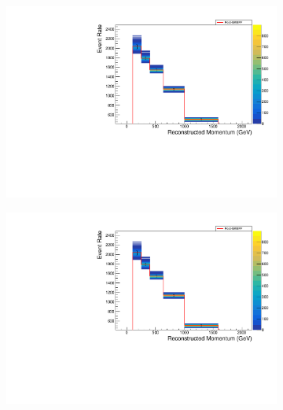 \begin{figure}[h]
  \begin{subfigure}[t]{0.49\textwidth}
    \includegraphics[width=\textwidth, trim={0mm 0mm 0mm 0mm}, clip,page=3]{Figures/OA/Overlay_ShiftSmear.pdf}
  \end{subfigure}%
  \begin{subfigure}[t]{0.49\textwidth}
    \includegraphics[width=\textwidth, trim={0mm 0mm 0mm 0mm}, clip,page=6]{Figures/OA/Overlay_ShiftSmear.pdf}
  \end{subfigure}
  \begin{subfigure}[t]{0.49\textwidth}

\end{subfigure}
\end{figure}
